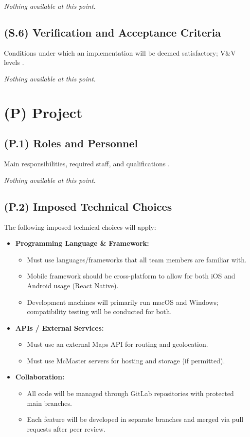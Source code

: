 \documentclass[12pt,letterpaper]{article}
\begin{document}
\textit{Nothing available at this point.}

\subsection{(S.6) Verification and Acceptance Criteria}
Conditions under which an implementation will be deemed satisfactory; V\&V levels \cite{meyer2022}.

\textit{Nothing available at this point.}

\clearpage

\section{(P) Project}

\subsection{(P.1) Roles and Personnel}
Main responsibilities, required staff, and qualifications \cite{meyer2022}.

\textit{Nothing available at this point.}

\subsection{(P.2) Imposed Technical Choices}
The following imposed technical choices will apply:
\begin{itemize}
  \item \textbf{Programming Language \& Framework:}
  \begin{itemize}
      \item Must use languages/frameworks that all team members are familiar with.
      \item Mobile framework should be cross-platform to allow for both iOS and Android usage (React Native).
      \item Development machines will primarily run macOS and Windows; compatibility testing will be conducted for both.
  \end{itemize}

  \item \textbf{APIs / External Services:}
  \begin{itemize}
      \item Must use an external Maps API for routing and geolocation.
      \item Must use McMaster servers for hosting and storage (if permitted).
  \end{itemize}

  \item \textbf{Collaboration:}
  \begin{itemize}
    \item All code will be managed through GitLab repositories with protected main branches.
    \item Each feature will be developed in separate branches and merged via pull requests after peer review.
  \end{itemize}
\end{itemize}
\end{document}
